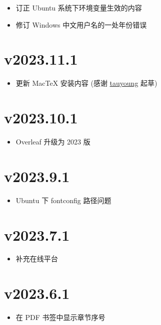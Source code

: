 \begin{itemize}
  \item 订正 Ubuntu 系统下环境变量生效的内容
  \item 修订 Windows 中文用户名的一处年份错误
\end{itemize}

\section*{v2023.11.1}

\begin{itemize}
  \item 更新 MacTeX 安装内容 (感谢 \href{https://github.com/tauyoungsama}{tauyoung} 起草)
\end{itemize}

\section*{v2023.10.1}

\begin{itemize}
  \item Overleaf 升级为 2023 版
\end{itemize}

\section*{v2023.9.1}

\begin{itemize}
  \item Ubuntu 下 fontconfig 路径问题
\end{itemize}

\section*{v2023.7.1}

\begin{itemize}
  \item 补充在线平台
\end{itemize}

\section*{v2023.6.1}

\begin{itemize}
  \item 在 PDF 书签中显示章节序号
\end{itemize}

